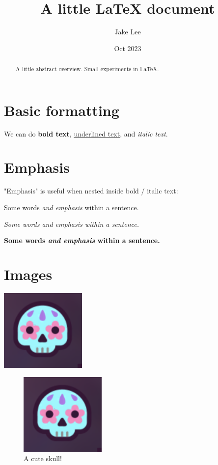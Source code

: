 \documentclass[12pt]{article}
\title{A little LaTeX document}
\author{Jake Lee}
\date{Oct 2023}
\begin{document}
\begin{abstract}
    A little abstract overview. Small experiments in LaTeX.
\end{abstract}

\maketitle 
\tableofcontents 

\section{Basic formatting}
We can do \textbf{bold text}, \underline{underlined text}, and \textit{italic text}.

\section{Emphasis}
"Emphasis" is useful when nested inside bold / italic text:

Some words \emph{and emphasis} within a sentence.

\textit{Some words \emph{and emphasis} within a sentence.}

\textbf{Some words \emph{and emphasis} within a sentence.}

\section{Images}
\includegraphics{skull}

\begin{figure}
    \centering
    \includegraphics{skull}
    \caption{A cute skull!}
    \label{fig:skull}
\end{figure}
\end{document}
